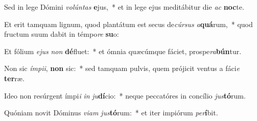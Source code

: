 \item Sed in lege Dómini \textit{vo}\textit{lún}\textit{tas} \textbf{e}jus,~* et in lege ejus meditábitur die \textit{ac} \textbf{noc}te.
\item Et erit tamquam lignum, quod plantátum est secus de\textit{cúr}\textit{sus} \textit{a}\textbf{quá}rum,~* quod fructum suum dabit in témpo\textit{re} \textbf{su}o:
\item Et fólium \textit{e}\textit{jus} \textit{non} \textbf{dé}fluet:~* et ómnia quæcúmque fáciet, prospe\textit{ra}\textbf{bún}tur.
\item Non sic \textit{ím}\textit{pi}\textit{i}, \textbf{non} sic:~* sed tamquam pulvis, quem prójicit ventus a fáci\textit{e} \textbf{ter}ræ.
\item Ideo non resúrgent ímpi\textit{i} \textit{in} \textit{ju}\textbf{dí}cio:~* neque peccatóres in concílio \textit{jus}\textbf{tó}rum.
\item Quóniam novit Dóminus \textit{vi}\textit{am} \textit{jus}\textbf{tó}rum:~* et iter impiórum \textit{per}\textbf{í}bit.
